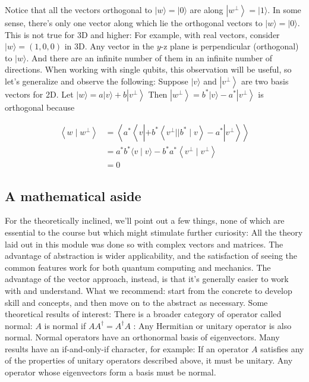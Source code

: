 \documentclass[main.tex]{subfiles}
\begin{document}
    Notice that all the vectors orthogonal to $|w\rangle=|0\rangle$ are along $\left|w^{\perp}\right\rangle=|1\rangle$. In some sense, there's only one vector along which lie the orthogonal vectors to $|w\rangle=|0\rangle$. This is not true for 3D and higher: For example, with real vectors, consider $|w\rangle=(1,0,0)$ in 3D. Any vector in the $y$-z plane is perpendicular (orthogonal) to $|w\rangle$. And there are an infinite number of them in an infinite number of directions. When working with single qubits, this observation will be useful, so let's generalize and observe the following: Suppose $|v\rangle$ and $\left|v^{\perp}\right\rangle$ are two basis vectors for 2D. Let $|w\rangle=a|v\rangle+b\left|v^{\perp}\right\rangle$ Then $\left|w^{\perp}\right\rangle=b^{*}|v\rangle-a^{*}\left|v^{\perp}\right\rangle$ is orthogonal because
    
    $$
    \begin{aligned}
    \left\langle w \mid w^{\perp}\right\rangle &=\left\langle a^{*}\left\langle v\left|+b^{*}\left\langle v^{\perp}|| b^{*} \mid v\right\rangle-a^{*}\right| v^{\perp}\right\rangle\right\rangle \\
    &=a^{*} b^{*}\langle v \mid v\rangle-b^{*} a^{*}\left\langle v^{\perp} \mid v^{\perp}\right\rangle \\
    &=0
    \end{aligned}
    $$

\subsection{A mathematical aside}

    For the theoretically inclined, we'll point out a few things, none of which are essential to the course but which might stimulate further curiosity: All the theory laid out in this module was done so with complex vectors and matrices. The advantage of abstraction is wider applicability, and the satisfaction of seeing the common features work for both quantum computing and mechanics. The advantage of the vector approach, instead, is that it's generally easier to work with and understand. What we recommend: start from the concrete to develop skill and concepts, and then move on to the abstract as necessary. Some theoretical results of interest: There is a broader category of operator called normal: $A$ is normal if $A A^{\dagger}=A^{\dagger} A$ : Any Hermitian or unitary operator is also normal. Normal operators have an orthonormal basis of eigenvectors. Many results have an if-and-only-if character, for example: If an operator $A$ satisfies any of the properties of unitary operators described above, it must be unitary. Any operator whose eigenvectors form a basis must be normal.
\end{document}
